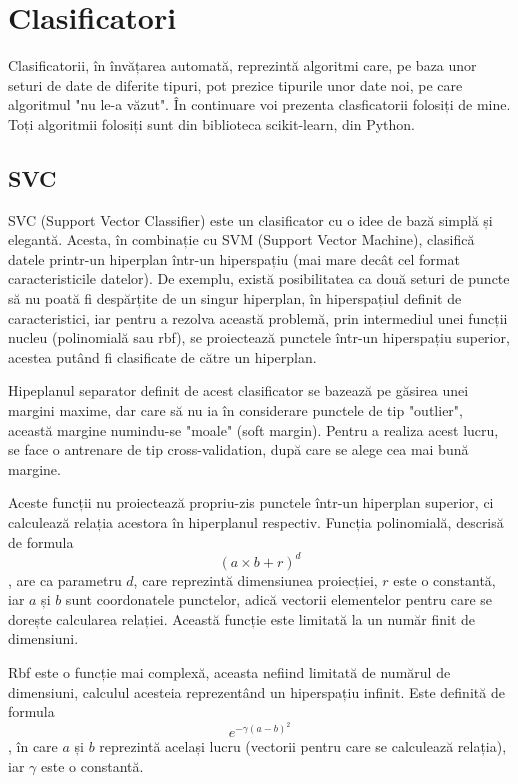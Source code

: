 \chapter{Clasificatori}

Clasificatorii, în învățarea automată, reprezintă algoritmi care, pe baza unor seturi de date de diferite tipuri,
pot prezice tipurile unor date noi, pe care algoritmul "nu le-a văzut". În continuare voi prezenta clasficatorii
folosiți de mine. Toți algoritmii folosiți sunt din biblioteca scikit-learn, din Python.

\section{SVC}

SVC (Support Vector Classifier) este un clasificator cu o idee de bază simplă și elegantă. Acesta, în combinație
cu SVM (Support Vector Machine), clasifică datele printr-un hiperplan într-un hiperspațiu (mai mare decât cel format caracteristicile datelor).
De exemplu, există posibilitatea ca două seturi de puncte să nu poată fi despărțite de un singur hiperplan, în hiperspațiul definit de caracteristici,
iar pentru a rezolva această problemă, prin intermediul unei funcții nucleu (polinomială sau rbf), se proiectează punctele într-un 
hiperspațiu superior, acestea putând fi clasificate de către un hiperplan.

Hipeplanul separator definit de acest clasificator se bazează pe găsirea unei margini maxime, dar care să nu ia în considerare
punctele de tip "outlier", această margine numindu-se "moale" (soft margin). Pentru a realiza acest lucru, se face o antrenare de tip
cross-validation, după care se alege cea mai bună margine.

Aceste funcții nu proiectează propriu-zis punctele într-un hiperplan superior, ci calculează relația acestora în hiperplanul respectiv.
Funcția polinomială, descrisă de formula \[(a \times b + r)^d\], are ca parametru \(d\), care reprezintă dimensiunea proiecției, \(r\) 
este o constantă, iar \(a\) și \(b\) sunt coordonatele punctelor, adică vectorii elementelor pentru care se dorește calcularea relației.
Această funcție este limitată la un număr finit de dimensiuni.

Rbf este o funcție mai complexă, aceasta nefiind limitată de numărul de dimensiuni, calculul acesteia reprezentând un hiperspațiu infinit.
Este definită de formula \[e^{-\gamma (a - b) ^ {2}}\], în care \(a\) și \(b\) reprezintă același lucru (vectorii pentru care se calculează relația), iar
\(\gamma\) este o constantă.

